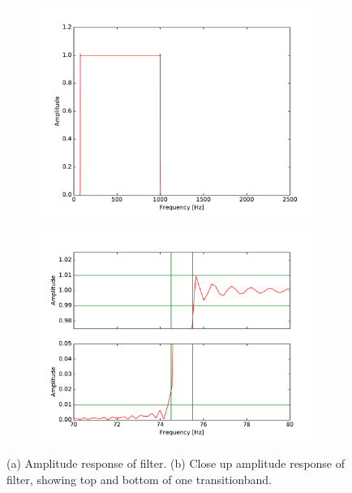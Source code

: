 \begin{figure}[H]
\centering
\begin{subfigure}{0.49\textwidth}
\centering
\includegraphics[width=\textwidth]{figures/filtertest/freq_response1.pdf}
\caption{}
\label{fig:freq_filt1}
\end{subfigure}
\begin{subfigure}{0.49\textwidth}
\centering
\includegraphics[width=\textwidth]{figures/filtertest/freq_response2.pdf}
\caption{}
\label{fig:freq_filt2}
\end{subfigure}
\caption{(a) Amplitude response of filter. (b) Close up amplitude response of filter, showing top and bottom of one transitionband.}
\label{fig:freq_filt}
\end{figure}


